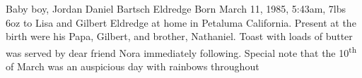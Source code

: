 Baby boy, Jordan Daniel Bartsch Eldredge Born March 11, 1985, 5:43am, 7lbs 6oz
to Lisa and Gilbert Eldredge at home in Petaluma California.  Present at the
birth were his Papa, Gilbert, and brother, Nathaniel.  Toast with loads of
butter was served by dear friend Nora immediately following.  Special note that
the 10\textsuperscript{th} of March was an auspicious day with rainbows
throughout

